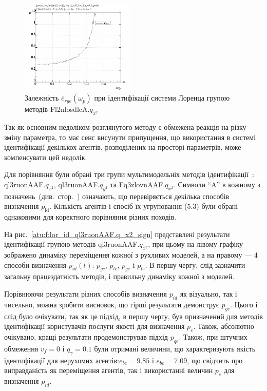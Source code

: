 \begin{figure}[ht!]
  \begin{center}
    \includegraphics[width=0.49\textwidth]{p/cha/lor/Fl2nlosdlcA/Fl2nlosdlcA-p_omega_p_e_0_wide.png}
  \end{center}
\caption{Залежність $\overline{e}_{rge}(\omega_p) $ при ідентифікації системи Лоренца групою методів Fl2nlosdlcA.$q_{x^2} $}
\label{atu:f:lor_Fl2nlosdlcA_e_omega_p_wide}
\end{figure}

Так як основним недоліком розглянутого методу є обмежена
реакція на різку зміну параметра, то має сенс висунути
припущення, що використання в системі ідентифікації декількох
агентів, розподілених на просторі параметрів, може компенсувати
цей недолік.


Для порівняння були обрані три групи мультимодельніх методів
ідентифікації~\cite{atu_ISDMCI2015,atu_asau26}:
ql3ruonAAF.$q_{x^2} $,
ql3ruonAAF.$q_{y^2} $ та
Fq3zlovnAAF.$q_{x^2} $.
Символи ``A'' в кожному з позначень~(див.~стор.~\pageref{atu:id_classification}) означають, що
перевіряється декілька способів визначення
$ p_\mathrm{id} $. Кількість агентів і спосіб їх угруповання (5.3) були
обрані однаковими для коректного порівняння різних походів.


На рис.~\ref{atu:f:lor_id_ql3ruonAAF.q_x2_sign} представлені результати
ідентифікації групою методів ql3ruonAAF.$q_{x^2}$, при цьому на лівому графіку зображено динаміку
переміщення кожної з рухливих моделей, а на правому --- 4 способи
визначення
$ p_{id} (t)$:
$ p_{gc} $,
$ p_{lc} $,
$ p_{ge} $ і
$ p_{le} $. В першу чергу, слід зазначити загальну працездатність
методів, і правильну динаміку кожної з моделей.


Порівнюючи результати різних способів визначення
$ p_{id} $ як візуально, так і чисельно, можна зробити висновок, що
гірші результати демонструє
$ p_{gc} $. Цього і слід було очікувати, так як це підхід, в першу
чергу, був призначений для методів ідентифікації користувачів
послуги якості для визначення
$ p_e $. Також, абсолютно очікувано, кращі результати
продемонстрував підхід
$ p_{qe} $. Також, при штучних обмеження
$ v_f = 0 $ і
$ q_\gamma = 0.1 $ були отримані величини, що характеризують якість
ідентифікації для нерухомих агентів:$ \overline{e}_{bc} = 9.85 $ і
$ \overline{e}_{be} = 7.09 $, що свідчить про виправданість як переміщення
агентів, так і використанні величин
$ p_e $ для визначення
$ p_{id} $.



